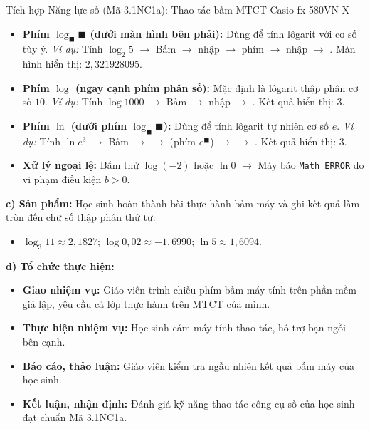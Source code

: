 \documentclass[12pt, a4paper]{article}
\begin{document}
\begin{aibox}{Tích hợp Năng lực số (Mã 3.1NC1a): Thao tác bấm MTCT Casio fx-580VN X}
\begin{itemize}[leftmargin=0.6cm]
    \item \textbf{Phím $\log_\blacksquare\blacksquare$ (dưới màn hình bên phải):} Dùng để tính lôgarit với cơ số tùy ý.
    \textit{Ví dụ:} Tính $\log_2 5$ $\to$ Bấm \fbox{$\log_\blacksquare\blacksquare$} $\to$ nhập  $\to$ phím \fbox{$\blacktriangleright$} $\to$ nhập  $\to$ \fbox{$=$}. Màn hình hiển thị: $2{,}321928095$.
    \item \textbf{Phím $\log$ (ngay cạnh phím phân số):} Mặc định là lôgarit thập phân cơ số $10$.
    \textit{Ví dụ:} Tính $\log 1000$ $\to$ Bấm \fbox{$\log$} $\to$ nhập  $\to$ \fbox{$=$}. Kết quả hiển thị: $3$.
    \item \textbf{Phím $\ln$ (dưới phím $\log_\blacksquare\blacksquare$):} Dùng để tính lôgarit tự nhiên cơ số $e$.
    \textit{Ví dụ:} Tính $\ln e^3$ $\to$ Bấm \fbox{$\ln$} $\to$  $\to$ \fbox{$\ln$} (phím $e^\blacksquare$) $\to$  $\to$ \fbox{$=$}. Kết quả hiển thị: $3$.
    \item \textbf{Xử lý ngoại lệ:} Bấm thử $\log(-2)$ hoặc $\ln 0$ $\to$ Máy báo \texttt{Math ERROR} do vi phạm điều kiện $b > 0$.
\end{itemize}
\end{aibox}

\noindent \textbf{c) Sản phẩm:}
Học sinh hoàn thành bài thực hành bấm máy và ghi kết quả làm tròn đến chữ số thập phân thứ tư:
\begin{itemize}
    \item $\log_3 11 \approx 2{,}1827$; $\log 0{,}02 \approx -1{,}6990$; $\ln 5 \approx 1{,}6094$.
\end{itemize}

\noindent \textbf{d) Tổ chức thực hiện:}
\begin{itemize}[leftmargin=0.6cm]
    \item \textbf{Giao nhiệm vụ:} Giáo viên trình chiếu phím bấm máy tính trên phần mềm giả lập, yêu cầu cả lớp thực hành trên MTCT của mình.
    \item \textbf{Thực hiện nhiệm vụ:} Học sinh cầm máy tính thao tác, hỗ trợ bạn ngồi bên cạnh.
    \item \textbf{Báo cáo, thảo luận:} Giáo viên kiểm tra ngẫu nhiên kết quả bấm máy của học sinh.
    \item \textbf{Kết luận, nhận định:} Đánh giá kỹ năng thao tác công cụ số của học sinh đạt chuẩn Mã 3.1NC1a.
\end{itemize}
\end{document}

